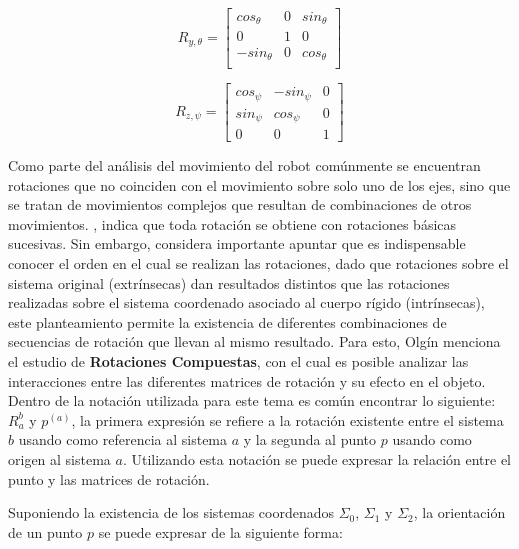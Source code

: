 \begin{equation}
    R_{y,\theta}=\begin{bmatrix}
    cos_{\theta} & 0 & sin_{\theta}\\
    0 & 1 & 0\\
    -sin_{\theta} & 0 & cos_{\theta}\\
    \end{bmatrix}
    \label{eqn:mtxRoty}
\end{equation}

\begin{equation}
    R_{z,\psi}=\begin{bmatrix}
    cos_{\psi} & -sin_{\psi} & 0\\
    sin_{\psi} & cos_{\psi} & 0\\
    0 & 0 & 1
    \end{bmatrix}
    \label{eqn:mtxRotz}
\end{equation}

Como parte del análisis del movimiento del robot comúnmente se encuentran rotaciones que no coinciden con el movimiento sobre solo uno de los ejes, sino que se tratan de movimientos complejos que resultan de combinaciones de otros movimientos. \cite{olguin_diaz_3d_2019}, indica que toda rotación se obtiene con rotaciones básicas sucesivas. Sin embargo, considera importante apuntar que es indispensable conocer el orden en el cual se realizan las rotaciones, dado que rotaciones sobre el sistema original (extrínsecas) dan resultados distintos que las rotaciones realizadas sobre el sistema coordenado asociado al cuerpo rígido (intrínsecas), este planteamiento permite la existencia de diferentes combinaciones de secuencias de rotación que llevan al mismo resultado. Para esto, Olgín menciona el estudio de \textbf{Rotaciones Compuestas}, con el cual es posible analizar las interacciones entre las diferentes matrices de rotación y su efecto en el objeto. Dentro de la notación utilizada para este tema es común encontrar lo siguiente: \textbf{$R_{a}^{b}$} y \textbf{$p^{(a)}$}, la primera expresión se refiere a la rotación existente entre el sistema \textbf{$b$} usando como referencia al sistema \textbf{$a$} y la segunda al punto \textbf{$p$} usando como origen al sistema \textbf{$a$}. Utilizando esta notación se puede expresar la relación entre el punto y las matrices de rotación.\newpage


Suponiendo la existencia de los sistemas coordenados $\Sigma_{0}$, $\Sigma_{1}$ y $\Sigma_{2}$, la orientación de un punto $p$ se puede expresar de la siguiente forma: 

